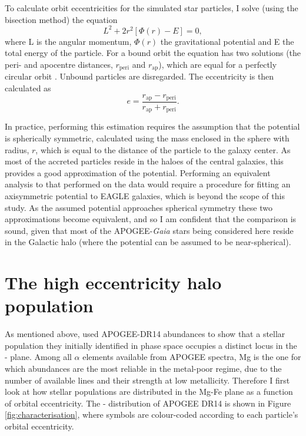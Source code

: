 To calculate orbit eccentricities for the simulated star particles,
I solve (using the bisection method) the equation
\begin{equation}
L^2 + 2 r^2 [\Phi(r) - E] = 0 ,
\end{equation}
where L is the angular momentum, $\Phi(r)$ the gravitational potential
and E the total energy of the particle. For a bound orbit the
equation has two solutions (the peri- and apocentre distances, $r_\mathrm{peri}$
and $r_\mathrm{ap}$), which are equal for a perfectly circular orbit \citep[][eq.
3.14]{2008gady.book.....B}. Unbound particles are disregarded.  The
eccentricity is then calculated as
\begin{equation}
e = \frac{r_\mathrm{ap}-r_\mathrm{peri} }{r_\mathrm{ap}+r_\mathrm{peri} }.
\end{equation}

In practice, performing this estimation requires the assumption
that the potential is spherically symmetric, calculated using the
mass enclosed in the sphere with radius, $r$, which is equal
to the distance of the particle to the galaxy center. As most of
the accreted particles reside in the haloes of the central galaxies,
this provides a good approximation of the potential. Performing an
equivalent analysis to that performed on the data would require a
procedure for fitting an axisymmetric potential to EAGLE galaxies,
which is beyond the scope of this study. As the assumed potential
approaches spherical symmetry these two approximations become
equivalent, and so I am confident that the comparison is sound,
given that most of the APOGEE-\emph{Gaia} stars being considered
here reside in the Galactic halo (where the potential can be assumed
to be near-spherical).


\section{The high eccentricity halo population} \label{highe}

As mentioned above, \citet{2018arXiv180606038H} used APOGEE-DR14
abundances to show that a stellar population they initially identified
in phase space occupies a distinct locus in the \afe{}-\feh{} plane.
Among all $\alpha$ elements available from APOGEE spectra, 
Mg is the one for which abundances are the most reliable in the
metal-poor regime, due to the number of available lines and their
strength at low metallicity.  Therefore I first look at
how stellar populations are distributed in the Mg-Fe plane as a
function of orbital eccentricity.  The \mgfe{}-\feh{}
distribution of APOGEE DR14 is shown in Figure \ref{fig:characterisation},
where symbols are colour-coded according to each particle's orbital
eccentricity.

